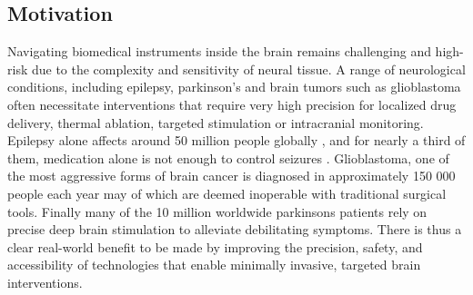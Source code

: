 



\subsection{Motivation}

Navigating biomedical instruments inside the brain remains challenging and high-risk due to the complexity and sensitivity of neural tissue. A range of neurological conditions, including epilepsy, parkinson's and brain tumors such as glioblastoma often necessitate interventions that require very high precision for localized drug delivery, thermal ablation, targeted stimulation or intracranial monitoring. Epilepsy alone affects around 50 million people globally \cite{noauthor_epilepsy_nodate}, and for nearly a third of them, medication alone is not enough to control seizures \cite{sultana_incidence_2021}. Glioblastoma, one of the most aggressive forms of brain cancer is diagnosed in approximately 150 000 people each year \cite{walsh_chapter_2016} may of which are deemed inoperable with traditional surgical tools. Finally many of the 10 million worldwide parkinsons patients \cite{noauthor_statistics_nodate} rely on precise deep brain stimulation to alleviate debilitating symptoms. There is thus a clear real-world benefit to be made by improving the precision, safety, and accessibility of technologies that enable minimally invasive, targeted brain interventions.

